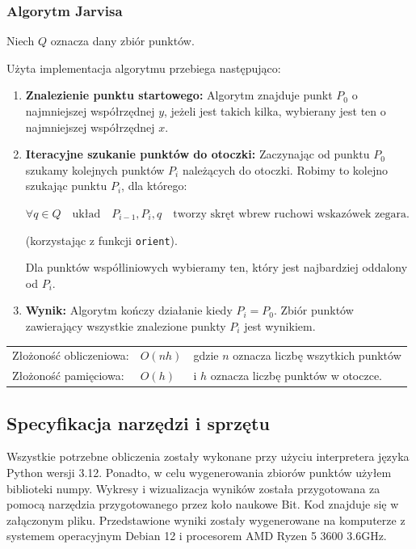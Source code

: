 \documentclass[11pt,a4paper]{article}
\begin{document}
\pagebreak

\subsubsection{Algorytm Jarvisa}
Niech $Q$ oznacza dany zbiór punktów.

Użyta implementacja algorytmu przebiega następująco:
\begin{enumerate}
    \item \textbf{Znalezienie punktu startowego:}
    Algorytm znajduje punkt $P_0$ o najmniejszej współrzędnej $y$, jeżeli
    jest takich kilka, wybierany jest ten o najmniejszej współrzędnej $x$.
    \item \textbf{Iteracyjne szukanie punktów do otoczki:}
    Zaczynając od punktu $P_0$ szukamy kolejnych punktów $P_i$
    należących do otoczki. Robimy to kolejno szukając punktu $P_i$,
    dla którego:

    $\forall q\in Q \quad \text{układ} \quad P_{i - 1}, P_i, q \quad
    \text{tworzy skręt wbrew ruchowi wskazówek zegara.}$
    
    \centering
    \footnotesize(korzystając z funkcji \verb|orient|).

    \raggedright
    \normalsize
    Dla punktów współliniowych wybieramy ten, 
    który jest najbardziej oddalony od $P_i$.
    \item \textbf{Wynik:}
    Algorytm kończy działanie kiedy $P_i = P_0$. Zbiór punktów 
    zawierający wszystkie znalezione punkty $P_i$ jest wynikiem.
\end{enumerate}

\begin{tabular}{l|l|l}
    Złożoność obliczeniowa: & $O(nh)$ & \footnotesize gdzie $n$ oznacza liczbę wszytkich punktów\\
    Złożoność pamięciowa: & $O(h)$ &  \footnotesize i $h$ oznacza liczbę punktów w otoczce.\\
\end{tabular}

\subsection{Specyfikacja narzędzi i sprzętu}
Wszystkie potrzebne obliczenia zostały wykonane przy użyciu interpretera języka Python wersji 3.12.
Ponadto, w celu wygenerowania zbiorów punktów użyłem biblioteki numpy. Wykresy i wizualizacja wyników została przygotowana za pomocą narzędzia
przygotowanego przez koło naukowe Bit. Kod znajduje się w załączonym pliku.
Przedstawione wyniki zostały wygenerowane na komputerze z systemem operacyjnym Debian 12 i 
procesorem AMD Ryzen 5 3600 3.6GHz.
\end{document}
